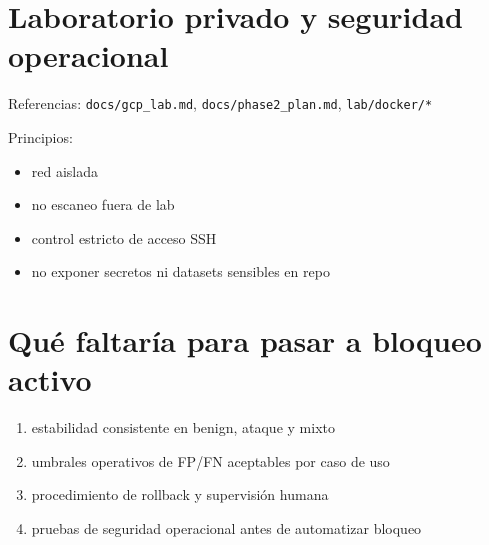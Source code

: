 ﻿\documentclass[12pt,a4paper]{article}
\begin{document}
\section{Laboratorio privado y seguridad operacional}

Referencias: \verb|docs/gcp_lab.md|, \verb|docs/phase2_plan.md|, \verb|lab/docker/*|

Principios:

\begin{itemize}
  \item red aislada
  \item no escaneo fuera de lab
  \item control estricto de acceso SSH
  \item no exponer secretos ni datasets sensibles en repo
\end{itemize}

\section{Qué faltaría para pasar a bloqueo activo}

\begin{enumerate}
  \item estabilidad consistente en benign, ataque y mixto
  \item umbrales operativos de FP/FN aceptables por caso de uso
  \item procedimiento de rollback y supervisión humana
  \item pruebas de seguridad operacional antes de automatizar bloqueo
\end{enumerate}
\end{document}
